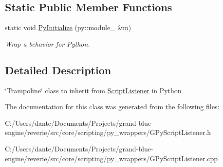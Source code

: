 \subsection*{Static Public Member Functions}
\begin{DoxyCompactItemize}
\item 
\mbox{\label{classrev_1_1_py_script_listener_aecf90af0233c4ce6428324b74425c8bf}} 
static void \mbox{\hyperlink{classrev_1_1_py_script_listener_aecf90af0233c4ce6428324b74425c8bf}{Py\+Initialize}} (py\+::module\+\_\+ \&m)
\begin{DoxyCompactList}\small\item\em Wrap a behavior for Python. \end{DoxyCompactList}\end{DoxyCompactItemize}


\subsection{Detailed Description}
\char`\"{}\+Trampoline\char`\"{} class to inherit from \mbox{\hyperlink{classrev_1_1_script_listener}{Script\+Listener}} in Python 

The documentation for this class was generated from the following files\+:\begin{DoxyCompactItemize}
\item 
C\+:/\+Users/dante/\+Documents/\+Projects/grand-\/blue-\/engine/reverie/src/core/scripting/py\+\_\+wrappers/G\+Py\+Script\+Listener.\+h\item 
C\+:/\+Users/dante/\+Documents/\+Projects/grand-\/blue-\/engine/reverie/src/core/scripting/py\+\_\+wrappers/G\+Py\+Script\+Listener.\+cpp\end{DoxyCompactItemize}
